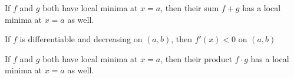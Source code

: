 \documentclass[handout]{ximera}
\begin{document}
\begin{exercise}
If $f$ and $g$ both have local minima at $x=a$, then their sum $f+g$ has a local minima at $x=a$ as well.
	\begin{multipleChoice}	
	\end{multipleChoice}
\end{exercise}

\begin{comment}


\begin{exercise}
If $f''(x)<0$ on $(2,5)$, and $f'(3)=0$, then there is a local max at $x=3$.
	\begin{multipleChoice}	
		\choice[correct]{True}
		\choice{False}
	\end{multipleChoice}
\end{exercise}

\end{comment}

\begin{exercise}
If $f$ is differentiable and decreasing on $(a,b)$, then $f'(x)<0$ on $(a,b)$

	\begin{multipleChoice}	
	\end{multipleChoice}
\end{exercise}

\begin{exercise}
If $f$ and $g$ both have local minima at $x=a$, then their product $f\cdot g$ has a local minima at $x=a$ as well.   

\begin{multipleChoice}	
\end{multipleChoice}
\end{exercise}
\end{document}
